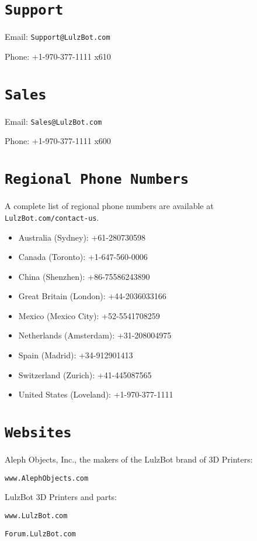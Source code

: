 %
%
%
%
%

\section{\texttt{Support}}
\setlength{\parindent}{0pt}
Email: \texttt{Support@LulzBot.com}

Phone: +1-970-377-1111 x610

\section{\texttt{Sales}}

Email: \texttt{Sales@LulzBot.com}

Phone: +1-970-377-1111 x600

\section{\texttt{Regional Phone Numbers}}
A complete list of regional phone numbers are available at \texttt{LulzBot.com/contact-us}. 
\begin{itemize}
\item Australia﻿ (Sydney﻿): +61-280730598
\item Canada (Toronto): +1-647-560-0006
\item China (Shenzhen): +86-75586243890
\item Great Britain (London﻿)﻿: +44-2036033166﻿
\item Mexico (Mexico City﻿)﻿: +52-5541708259
\item Netherlands (Amsterdam﻿)﻿: +31-208004975
\item Spain﻿ (Madrid﻿): +34-912901413﻿
\item Switzerland﻿ (Zurich﻿)﻿: +41-445087565
\item United States (Loveland): +1-970-377-1111
\end{itemize}

\section{\texttt{Websites}}

Aleph Objects, Inc., the makers of the LulzBot\textsuperscript{\miniscule{\textregistered}} brand of 3D Printers:

\texttt{www.AlephObjects.com}


LulzBot 3D Printers and parts:

\texttt{www.LulzBot.com}

\texttt{Forum.LulzBot.com}
